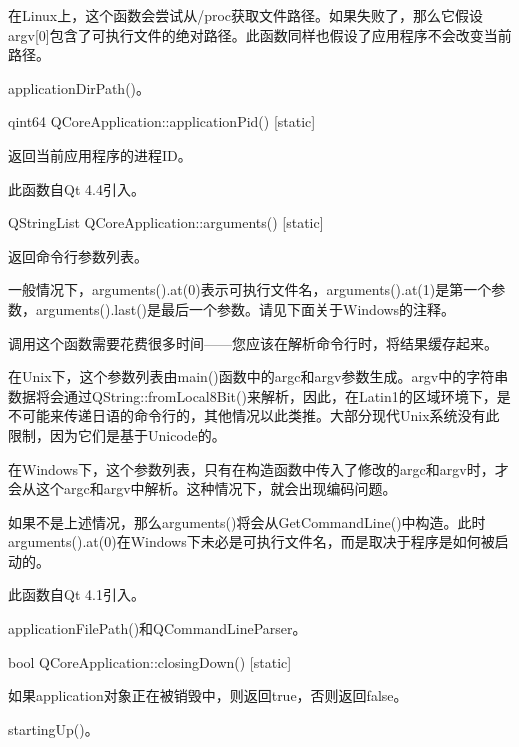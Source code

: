 \begin{notice}[警告]
在Linux上，这个函数会尝试从/proc获取文件路径。如果失败了，那么它假设argv[0]包含了可执行文件的绝对路径。此函数同样也假设了应用程序不会改变当前路径。
\end{notice}




\begin{notice}[另请参阅]
applicationDirPath()。
\end{notice}

qint64 QCoreApplication::applicationPid() [static]

返回当前应用程序的进程ID。

此函数自Qt 4.4引入。

QStringList QCoreApplication::arguments() [static]

返回命令行参数列表。

一般情况下，arguments().at(0)表示可执行文件名，arguments().at(1)是第一个参数，arguments().last()是最后一个参数。请见下面关于Windows的注释。

调用这个函数需要花费很多时间——您应该在解析命令行时，将结果缓存起来。



\begin{notice}[警告]
在Unix下，这个参数列表由main()函数中的argc和argv参数生成。argv中的字符串数据将会通过QString::fromLocal8Bit()来解析，因此，在Latin1的区域环境下，是不可能来传递日语的命令行的，其他情况以此类推。大部分现代Unix系统没有此限制，因为它们是基于Unicode的。
\end{notice}

在Windows下，这个参数列表，只有在构造函数中传入了修改的argc和argv时，才会从这个argc和argv中解析。这种情况下，就会出现编码问题。

如果不是上述情况，那么arguments()将会从GetCommandLine()中构造。此时arguments().at(0)在Windows下未必是可执行文件名，而是取决于程序是如何被启动的。

此函数自Qt 4.1引入。



\begin{notice}[另请参阅]
applicationFilePath()和QCommandLineParser。
\end{notice}

bool QCoreApplication::closingDown() [static]

如果application对象正在被销毁中，则返回true，否则返回false。


\begin{notice}[另请参阅]
startingUp()。
\end{notice}

